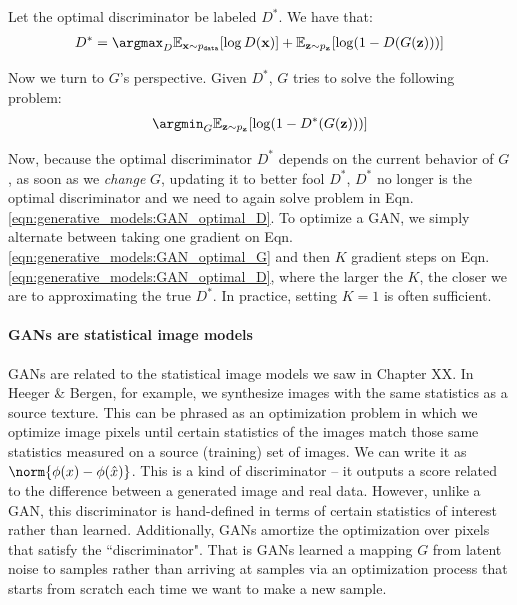 Let the optimal discriminator be labeled $D^*$. We have that:
\begin{align}
    D^* = \argmax_D \mathbb{E}_{\mathbf{x} \sim p_{\texttt{data}}}[\log D(\mathbf{x})] + \mathbb{E}_{\mathbf{z} \sim p_{\mathbf{z}}}[\log (1-D(G(\mathbf{z})))] \label{eqn:generative_models:GAN_optimal_D}
\end{align}

Now we turn to $G$'s perspective. Given $D^*$, $G$ tries to solve the following problem:
\begin{align}
    \argmin_G \mathbb{E}_{\mathbf{z} \sim p_{\mathbf{z}}}[\log (1-D^*(G(\mathbf{z})))] \label{eqn:generative_models:GAN_optimal_G}
\end{align}

Now, because the optimal discriminator $D^*$ depends on the current behavior of $G$, as soon as we \textit{change} $G$, updating it to better fool $D^*$, $D^*$ no longer is the optimal discriminator and we need to again solve problem in Eqn. \ref{eqn:generative_models:GAN_optimal_D}. To optimize a GAN, we simply alternate between taking one gradient on Eqn. \ref{eqn:generative_models:GAN_optimal_G} and then $K$ gradient steps on Eqn. \ref{eqn:generative_models:GAN_optimal_D}, where the larger the $K$, the closer we are to approximating the true $D^*$. In practice, setting $K=1$ is often sufficient.

\paragraph{GANs are statistical image models}
GANs are related to the statistical image models we saw in Chapter XX. In Heeger \& Bergen, for example, we synthesize images with the same statistics as a source texture. This can be phrased as an optimization problem in which we optimize image pixels until certain statistics of the images match those same statistics measured on a source (training) set of images. We can write it as $\norm{\phi(x) - \phi(\hat{x})}$. This is a kind of discriminator -- it outputs a score related to the difference between a generated image and real data. However, unlike a GAN, this discriminator is hand-defined in terms of certain statistics of interest rather than learned. Additionally, GANs amortize the optimization over pixels that satisfy the ``discriminator". That is GANs learned a mapping $G$ from latent noise to samples rather than arriving at samples via an optimization process that starts from scratch each time we want to make a new sample.


